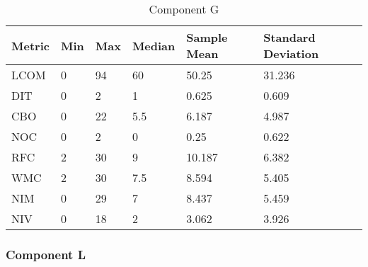 \begin{table}[]
\centering
\caption{Component G}
\label{tab:oometrics-guri}
\begin{tabular}{|l|l|l|l|l|l|}
\hline
\textbf{Metric} & \textbf{Min} & \textbf{Max} & \textbf{Median} & \textbf{Sample Mean} & \textbf{Standard Deviation} \\ \hline
LCOM            & 0            & 94           & 60              & 50.25                & 31.236                      \\ \hline
DIT             & 0            & 2            & 1               & 0.625                & 0.609                       \\ \hline
CBO             & 0            & 22           & 5.5             & 6.187                & 4.987                       \\ \hline
NOC             & 0            & 2            & 0               & 0.25                 & 0.622                       \\ \hline
RFC             & 2            & 30           & 9               & 10.187               & 6.382                       \\ \hline
WMC             & 2            & 30           & 7.5             & 8.594                & 5.405                       \\ \hline
NIM             & 0            & 29           & 7               & 8.437                & 5.459                       \\ \hline
NIV             & 0            & 18           & 2               & 3.062                & 3.926                       \\ \hline
\end{tabular}
\end{table}










\subsubsection{Component L}

